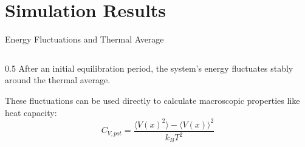 \documentclass[aspectratio=169]{beamer}
\begin{document}
\section{Simulation Results}
\begin{frame}{Energy Fluctuations and Thermal Average}
    \begin{columns}
        \begin{column}{0.5\textwidth}
            After an initial equilibration period, the system's energy fluctuates stably around the thermal average. 
            
            \vspace{0.3cm}
            These fluctuations can be used directly to calculate macroscopic properties like heat capacity:
            $$C_{V,pot} = \frac{\langle V(x)^2 \rangle - \langle V(x) \rangle^2}{k_B T^2}$$
        \end{column}
        
    \end{columns}
\end{frame}
\end{document}
